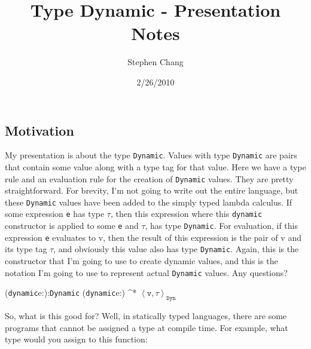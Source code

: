 \documentclass[12pt]{article}	%
\begin{document}
\newcommand{\Dynamic}{\texttt{Dynamic}\xspace}
\newcommand{\typecase}{\texttt{typecase}\xspace}
\newcommand{\dynamic}{\texttt{dynamic}\xspace}
\newcommand{\wrong}{\texttt{wrong}\xspace}
\newcommand{\deno}[1]{ \ensuremath{[\![#1]\!]} }
\newcommand{\code}[1]{$\mathtt{#1}$}
\newcommand{\pair}[2]{ \ensuremath{\left\langle #1,#2 \right\rangle} }
\newcommand{\pairtt}[2]{ \ensuremath{\left\langle \mathtt{#1,#2} \right\rangle} }
\newcommand{\dyn}[2]{ \ensuremath{ \pairtt{v}{\tau}_\texttt{Dyn} } }


\title{Type Dynamic - Presentation Notes}
\author{Stephen Chang}
\date{2/26/2010}
\maketitle

\subsection*{Motivation}
My presentation is about the type \Dynamic. Values with type \Dynamic are pairs that contain some value along with a type tag for that value. Here we have a type rule and an evaluation rule for the creation of \Dynamic values. They are pretty straightforward. For brevity, I'm not going to write out the entire language, but these \Dynamic values have been added to the simply typed lambda calculus. If some expression \texttt{e} has type $\mathtt{\tau}$, then this expression where this \dynamic constructor is applied to some \texttt{e} and $\mathtt{\tau}$, has type \Dynamic. For evaluation, if this expression \texttt{e} evaluates to v, then the result of this expression is the pair of v and its type tag $\tau$, and obviously this value also has type \Dynamic. Again, this is the constructor that I'm going to use to create dynamic values, and this is the notation I'm going to use to represent actual \Dynamic values. Any questions?

          { \Gamma\vdash (\dynamic\;e:\tau):\Dynamic }
          { (\dynamic\;e:\tau) \rightarrow^* \dyn{v}{\tau} }

$\;$\\

So, what is this good for? Well, in statically typed languages, there are some programs that cannot be assigned a type at compile time. For example, what type would you assign to this function:
\end{document}
